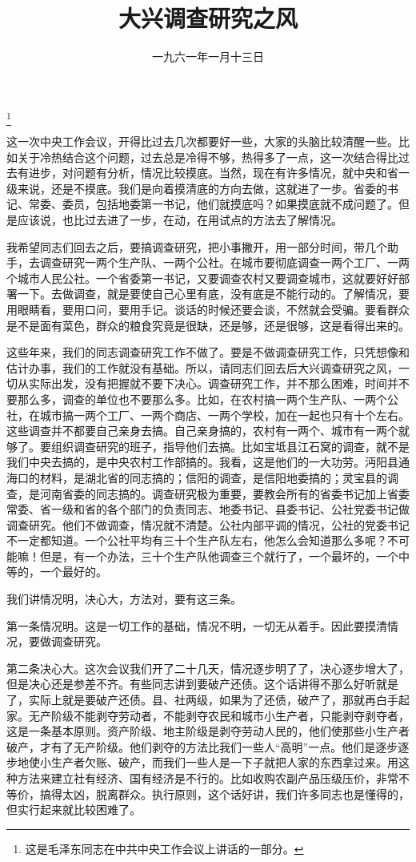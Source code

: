 
\title{大兴调查研究之风}
\date{一九六一年一月十三日}
\thanks{这是毛泽东同志在中共中央工作会议上讲话的一部分。}
\maketitle


这一次中央工作会议，开得比过去几次都要好一些，大家的头脑比较清醒一些。比如关于冷热结合这个问题，过去总是冷得不够，热得多了一点，这一次结合得比过去有进步，对问题有分析，情况比较摸底。当然，现在有许多情况，就中央和省一级来说，还是不摸底。我们是向着摸清底的方向去做，这就进了一步。省委的书记、常委、委员，包括地委第一书记，他们就摸底吗？如果摸底就不成问题了。但是应该说，也比过去进了一步，在动，在用试点的方法去了解情况。

我希望同志们回去之后，要搞调查研究，把小事撇开，用一部分时间，带几个助手，去调查研究一两个生产队、一两个公社。在城市要彻底调查一两个工厂、一两个城市人民公社。一个省委第一书记，又要调查农村又要调查城市，这就要好好部署一下。去做调查，就是要使自己心里有底，没有底是不能行动的。了解情况，要用眼睛看，要用口问，要用手记。谈话的时候还要会谈，不然就会受骗。要看群众是不是面有菜色，群众的粮食究竟是很缺，还是够，还是很够，这是看得出来的。

这些年来，我们的同志调查研究工作不做了。要是不做调查研究工作，只凭想像和估计办事，我们的工作就没有基础。所以，请同志们回去后大兴调查研究之风，一切从实际出发，没有把握就不要下决心。调查研究工作，并不那么困难，时间并不要那么多，调查的单位也不要那么多。比如，在农村搞一两个生产队、一两个公社，在城市搞一两个工厂、一两个商店、一两个学校，加在一起也只有十个左右。这些调查并不都要自己亲身去搞。自己亲身搞的，农村有一两个、城市有一两个就够了。要组织调查研究的班子，指导他们去搞。比如宝坻县江石窝的调查，就不是我们中央去搞的，是中央农村工作部搞的。我看，这是他们的一大功劳。沔阳县通海口的材料，是湖北省的同志搞的；信阳的调查，是信阳地委搞的；灵宝县的调查，是河南省委的同志搞的。调查研究极为重要，要教会所有的省委书记加上省委常委、省一级和省的各个部门的负责同志、地委书记、县委书记、公社党委书记做调查研究。他们不做调查，情况就不清楚。公社内部平调的情况，公社的党委书记不一定都知道。一个公社平均有三十个生产队左右，他怎么会知道那么多呢？不可能嘛！但是，有一个办法，三十个生产队他调查三个就行了，一个最坏的，一个中等的，一个最好的。

我们讲情况明，决心大，方法对，要有这三条。

第一条情况明。这是一切工作的基础，情况不明，一切无从着手。因此要摸清情况，要做调查研究。

第二条决心大。这次会议我们开了二十几天，情况逐步明了了，决心逐步增大了，但是决心还是参差不齐。有些同志讲到要破产还债。这个话讲得不那么好听就是了，实际上就是要破产还债。县、社两级，如果为了还债，破产了，那就再白手起家。无产阶级不能剥夺劳动者，不能剥夺农民和城市小生产者，只能剥夺剥夺者，这是一条基本原则。资产阶级、地主阶级是剥夺劳动人民的，他们使那些小生产者破产，才有了无产阶级。他们剥夺的方法比我们一些人“高明”一点。他们是逐步逐步地使小生产者欠账、破产，而我们一些人是一下子就把人家的东西拿过来。用这种方法来建立社有经济、国有经济是不行的。比如收购农副产品压级压价，非常不等价，搞得太凶，脱离群众。执行原则，这个话好讲，我们许多同志也是懂得的，但实行起来就比较困难了。

